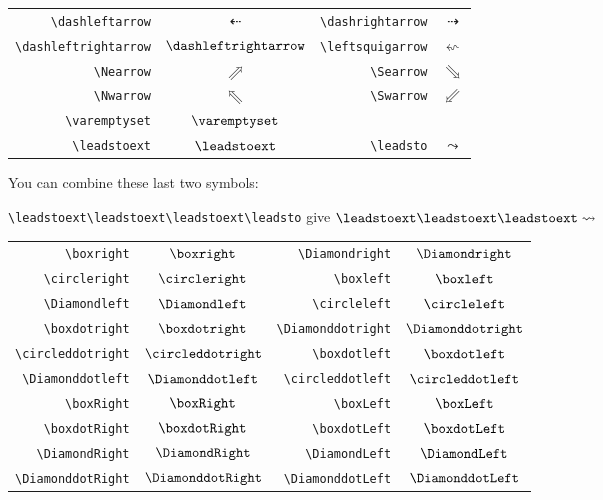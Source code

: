 \documentclass[a4paper,11pt]{christophe}
\begin{document}
\begin{center}\begin{tabular}{r>{$}c<{$}|r>{$}c<{$}}

\verb=\dashleftarrow=&\dashleftarrow&\verb=\dashrightarrow=&\dashrightarrow\\
\verb=\dashleftrightarrow=&\dashleftrightarrow&\verb=\leftsquigarrow=&\leftsquigarrow\\
\verb=\Nearrow=&\Nearrow&\verb=\Searrow=&\Searrow\\
\verb=\Nwarrow=&\Nwarrow&\verb=\Swarrow=&\Swarrow\\
\verb=\varemptyset=&\varemptyset& & \\
\verb=\leadstoext=&\leadstoext&\verb=\leadsto=&\leadsto\\

\end{tabular}\end{center}

You can combine these last two symbols:

\verb=\leadstoext\leadstoext\leadstoext\leadsto=
give\quad
$\leadstoext\leadstoext\leadstoext\leadsto$

\begin{center}\begin{tabular}{r>{$}c<{$}|r>{$}c<{$}}

\verb=\boxright=&\boxright&\verb=\Diamondright=&\Diamondright\\
\verb=\circleright=&\circleright&\verb=\boxleft=&\boxleft\\
\verb=\Diamondleft=&\Diamondleft&\verb=\circleleft=&\circleleft\\
\verb=\boxdotright=&\boxdotright&\verb=\Diamonddotright=&\Diamonddotright\\
\verb=\circleddotright=&\circleddotright&\verb=\boxdotleft=&\boxdotleft\\
\verb=\Diamonddotleft=&\Diamonddotleft&\verb=\circleddotleft=&\circleddotleft\\
\verb=\boxRight=&\boxRight&\verb=\boxLeft=&\boxLeft\\
\verb=\boxdotRight=&\boxdotRight&\verb=\boxdotLeft=&\boxdotLeft\\
\verb=\DiamondRight=&\DiamondRight&\verb=\DiamondLeft=&\DiamondLeft\\
\verb=\DiamonddotRight=&\DiamonddotRight&\verb=\DiamonddotLeft=&\DiamonddotLeft\\

\end{tabular}\end{center}
\end{document}
